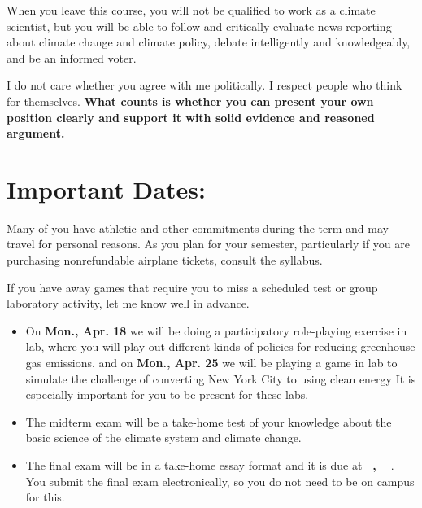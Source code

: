 \documentclass[11pt,twoside]{jgsyllabus}\usepackage[]{graphicx}\usepackage[]{color}
\begin{document}
When you leave this course, you will not be qualified to work as a climate
scientist, but you will be able to follow and critically evaluate news
reporting about climate change and climate policy, debate intelligently and
knowledgeably, and be an informed voter.

I do not care whether you agree with me politically.
I respect people who think for themselves.
\textbf{What counts is whether you can present your own position clearly
and support it with solid evidence and reasoned argument.}
%
%
%
\iftrue
\section{Important Dates:}
Many of you have athletic and other commitments during the term and may travel
for personal reasons. As you plan for your semester, particularly if you are
purchasing nonrefundable airplane tickets, consult the syllabus.

If you have away games that require you to miss a scheduled test or group
laboratory activity, let me know well in advance.
\begin{itemize}
  \iffalse
    \item The mid-term test is on
      \textbf{Monday, February~28}.
  \fi
  \item On
    \textbf{Mon., Apr. 18}
    we will be doing a participatory role-playing
    exercise in lab, where you will play out different kinds of policies
    for reducing greenhouse gas emissions.
    and on
    \textbf{Mon., Apr. 25}
    we will be playing a game in lab to simulate the challenge of converting
    New York City to using clean energy
    It is especially important for you to  be present for these labs.
\item The midterm exam will be a take-home test of your knowledge about the
    basic science of the climate system and climate change.
\item The final exam will be in a take-home essay format and it is due at
  \textbf{\TakeHomeExamEndTime~\TakeHomeExamDay,
    \TakeHomeExamMonth~\TakeHomeExamDate}%
  . You submit the final exam electronically, so you do not need to be on campus
  for this.
\end{itemize}
\fi
%
%
%
%
%
\clearpage
\end{document}
